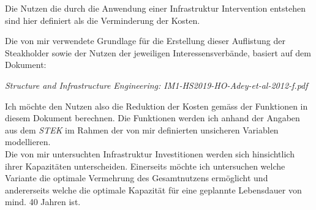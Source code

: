 Die Nutzen die durch die Anwendung einer Infrastruktur Intervention entstehen sind hier definiert als die Verminderung der Kosten. 

Die von mir verwendete Grundlage für die Erstellung dieser Auflistung der Steakholder sowie der Nutzen der jeweiligen Interessensverbände, basiert auf dem Dokument:


\noindent\hspace*{10mm}\textit{Structure and Infrastructure Engineering: IM1-HS2019-HO-Adey-et-al-2012-f.pdf} 


Ich möchte den Nutzen also die Reduktion der Kosten gemäss der Funktionen in diesem Dokument berechnen. 
Die Funktionen werden ich anhand der Angaben aus dem \textit{STEK} im Rahmen der von mir definierten unsicheren Variablen modellieren. \\ [2ex]
Die von mir untersuchten Infrastruktur Investitionen werden sich hinsichtlich ihrer Kapazitäten unterscheiden. Einerseits möchte ich untersuchen welche Variante die optimale Vermehrung des Gesamtnutzens ermöglicht und andererseits welche die optimale Kapazität für eine geplannte Lebensdauer von mind. 40 Jahren ist. 


%


